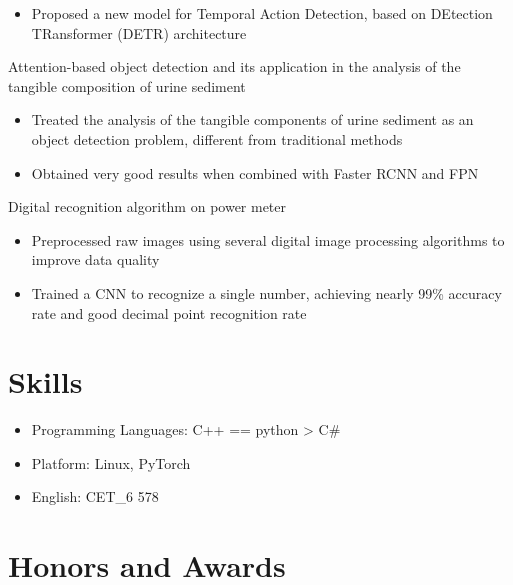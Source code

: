 \documentclass{resume}
\begin{document}
\begin{itemize}
  \item Proposed a new model for Temporal Action Detection, based on DEtection TRansformer (DETR) architecture
\end{itemize}

Attention-based object detection and its application in the analysis of the tangible composition of urine sediment
\begin{itemize}
  \item Treated the analysis of the tangible components of urine sediment as an object detection problem, different from traditional methods
  \item Obtained very good results when combined with Faster RCNN and FPN
\end{itemize}

Digital recognition algorithm on power meter
\begin{itemize}
  \item Preprocessed raw images using several digital image processing algorithms to improve data quality
  \item Trained a CNN to recognize a single number, achieving nearly 99\% accuracy rate and good decimal point recognition rate
\end{itemize}


\section{Skills}
\begin{itemize}[parsep=0.5ex]
  \item Programming Languages: C++ == python > C\#
  \item Platform: Linux, PyTorch
  \item English: CET\_6 578
\end{itemize}

\section{Honors and Awards}

%
%
\end{document}
